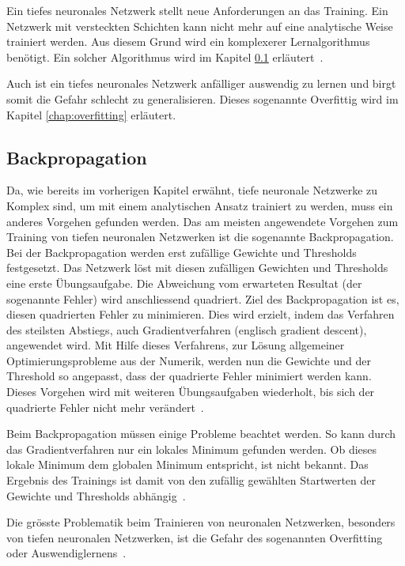Ein tiefes neuronales Netzwerk stellt neue Anforderungen an das Training. Ein Netzwerk mit versteckten Schichten kann nicht mehr auf eine analytische Weise trainiert werden. Aus diesem Grund wird ein komplexerer Lernalgorithmus benötigt. Ein solcher Algorithmus wird im Kapitel \ref{chap:backpropagation} erläutert~\autocite{Krogh2008}. 

Auch ist ein tiefes neuronales Netzwerk anfälliger auswendig zu lernen und birgt somit die Gefahr schlecht zu generalisieren. Dieses sogenannte Overfittig wird im Kapitel \ref{chap:overfitting} erläutert.

\subsection{Backpropagation}
\label{chap:backpropagation}

Da, wie bereits im vorherigen Kapitel erwähnt, tiefe neuronale Netzwerke zu Komplex sind, um mit einem analytischen Ansatz trainiert zu werden, muss ein anderes Vorgehen gefunden werden. Das am meisten angewendete Vorgehen zum Training von tiefen neuronalen Netzwerken ist die sogenannte Backpropagation. Bei der Backpropagation werden erst zufällige Gewichte und Thresholds festgesetzt. Das Netzwerk löst mit diesen zufälligen Gewichten und Thresholds eine erste Übungsaufgabe. Die Abweichung vom erwarteten Resultat (der sogenannte Fehler) wird anschliessend quadriert. Ziel des Backpropagation ist es, diesen quadrierten Fehler zu minimieren. Dies wird erzielt, indem das Verfahren des steilsten Abstiegs, auch Gradientverfahren (englisch gradient descent), angewendet wird. Mit Hilfe dieses Verfahrens, zur Lösung allgemeiner Optimierungsprobleme aus der Numerik, werden nun die Gewichte und der Threshold so angepasst, dass der quadrierte Fehler minimiert werden kann. Dieses Vorgehen wird mit weiteren Übungsaufgaben wiederholt, bis sich der quadrierte Fehler nicht mehr verändert~\autocite{Krogh2008}.

Beim Backpropagation müssen einige Probleme beachtet werden. So kann durch das Gradientverfahren nur ein lokales Minimum gefunden werden. Ob dieses lokale Minimum dem globalen Minimum entspricht, ist nicht bekannt. Das Ergebnis des Trainings ist damit von den zufällig gewählten Startwerten der Gewichte und Thresholds abhängig~\autocite{Krogh2008}.

Die grösste Problematik beim Trainieren von neuronalen Netzwerken, besonders von tiefen neuronalen Netzwerken, ist die Gefahr des sogenannten Overfitting oder Auswendiglernens~\autocite{Krogh2008}.

